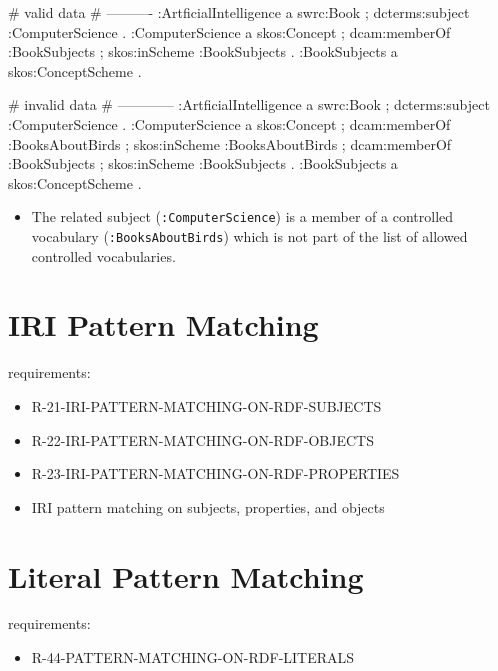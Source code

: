 \documentclass{llncs}
\newcommand{\ms}[1]{\texttt{#1}}
\begin{document}
\begin{ex}
# valid data
# ----------
:ArtficialIntelligence
    a swrc:Book ;
    dcterms:subject :ComputerScience .
:ComputerScience
    a skos:Concept ;
    dcam:memberOf :BookSubjects ;
    skos:inScheme :BookSubjects .
:BookSubjects
    a skos:ConceptScheme .
\end{ex}

\begin{ex}
# invalid data
# ------------
:ArtficialIntelligence
    a swrc:Book ;
    dcterms:subject :ComputerScience .
:ComputerScience
    a skos:Concept ;
    dcam:memberOf :BooksAboutBirds ;
    skos:inScheme :BooksAboutBirds ;
    dcam:memberOf :BookSubjects ;
    skos:inScheme :BookSubjects .
:BookSubjects
    a skos:ConceptScheme .
\end{ex}

\begin{itemize}
	\item The related subject (\ms{:ComputerScience}) is a member of a controlled vocabulary (\ms{:BooksAboutBirds}) 
which is not part of the list of allowed controlled vocabularies.
\end{itemize}

\section{IRI Pattern Matching}

requirements:

\begin{itemize}
	\item R-21-IRI-PATTERN-MATCHING-ON-RDF-SUBJECTS
  \item R-22-IRI-PATTERN-MATCHING-ON-RDF-OBJECTS
  \item R-23-IRI-PATTERN-MATCHING-ON-RDF-PROPERTIES
\end{itemize}



\begin{itemize}
	\item IRI pattern matching on subjects, properties, and objects
\end{itemize}

\section{Literal Pattern Matching}

requirements:

\begin{itemize}
  \item R-44-PATTERN-MATCHING-ON-RDF-LITERALS
\end{itemize}
\end{document}
